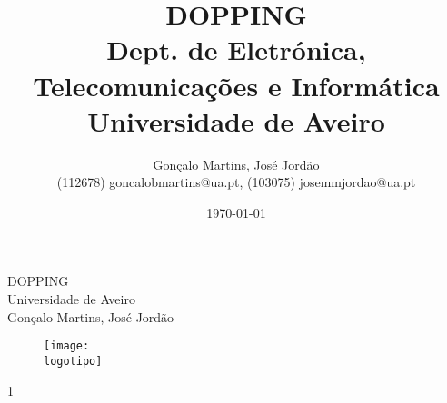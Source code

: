 \documentclass{report}
\begin{document}
%
\def\titulo{DOPPING}
\def\data{DATA}
\def\autores{Gonçalo Martins, José Jordão}
\def\autorescontactos{(112678) goncalobmartins@ua.pt, (103075) josemmjordao@ua.pt}
\def\versao{1}
\def\departamento{Dept. de Eletrónica, Telecomunicações e Informática}
\def\empresa{Universidade de Aveiro}
\def\logotipo{ua.pdf}
%
%
\begin{titlepage}

\begin{center}
%
\vspace*{50mm}
%
{\Huge \titulo}\\ 
%
\vspace{10mm}
%
{\Large \empresa}\\
%
\vspace{10mm}
%
{\LARGE \autores}\\ 
%
\vspace{30mm}
%
\begin{figure}[h]
\center
\texttt{[image: \\logotipo]}
\end{figure}
%
\vspace{30mm}
\end{center}
%
\begin{flushright}
\versao
\end{flushright}
\end{titlepage}

\title{%
{\Huge\textbf{\titulo}}\\
{\Large \departamento\\ \empresa}
}
%
\author{%
    \autores \\
    \autorescontactos
}
%
\date{\today}
%
\maketitle


\end{document}
